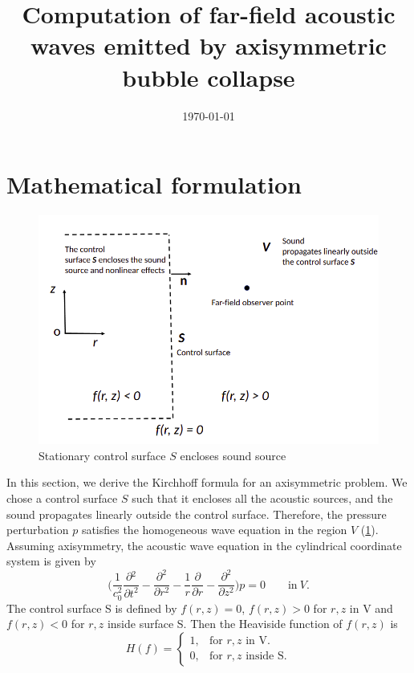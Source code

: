 \documentclass[a4paper]{article}
\title{Computation of far-field acoustic waves emitted by axisymmetric bubble collapse}
\author{}
\date{\today}
\begin{document}
\maketitle
\section{Mathematical formulation}
\begin{figure}[h!]\label{schematic}
	\centering
	\includegraphics[width=12cm]{images/shematic.png}
	\caption{Stationary control surface $S$ encloses sound source}
\end{figure}
In this section, we derive the Kirchhoff formula for an axisymmetric problem. We chose a control surface $S$ such that it encloses all the acoustic sources, and the sound propagates linearly outside the control surface. Therefore, the pressure perturbation $p$ satisfies the homogeneous wave equation in the region $V$ (\ref{schematic}).  Assuming axisymmetry, the acoustic wave equation in the cylindrical coordinate system is given by 
\begin{equation}\label{Wave equation}
	\Bigg( \frac{1}{c_{0}^2}\frac{\partial{}^{2}}{\partial{t}^{2}}- \frac{\partial^2}{\partial r^2} - \frac{1}{r}\frac{\partial}{\partial r} - \frac{\partial^2}{\partial z^2}\Bigg) p = 0 \quad \quad \textrm{in} \ V.
\end{equation}
The control surface S is defined by $f(r, z) = 0$, $f(r, z) > 0$ for $r, z$ in V and $f(r, z) < 0$ for $r, z$ inside surface S. Then the Heaviside function of $f(r, z)$ is
\begin{equation}\label{Heaviside}
	H(f) =\begin{cases}
		1, & \text{for $r, z$ in V}.     \\
		0, & \text{for $r, z$ inside S}.
	\end{cases}
\end{equation}
\end{document}
